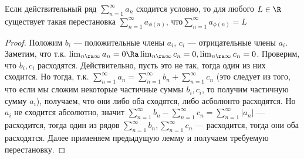 
\begin{theorem}[Римана]
    Если действительный ряд \(\sum_{n = 1}^\infty a_n\) сходится условно, то для любого \(L \in \R\) существует такая перестановка \(\sum_{n = 1}^\infty a_{\phi(n)}\), что\(\sum_{n = 1}^\infty a_{\phi(n)} = L\)
\end{theorem}
\begin{proof}
    Положим \(b_i\) --- положительные члены \(a_i\), \(c_i\) --- отрицательные члены \(a_i\). Заметим, что т.к. \(\lim_{n \ra \infty} a_n = 0 \Ra \lim_{n \ra \infty} c_n = 0, \lim_{n \ra \infty} c_n = 0\). Проверим, что \(b_i, c_i\) расходятся. Действительно, пусть это не так, тогда один из них сходится. Но тогда, т.к. \(\sum_{n = 1}^\infty a_n = \sum_{n = 1}^\infty b_n + \sum_{n = 1}^\infty c_n\) (это следует из того, что если мы сложим некоторые частичные суммы \(b_i, c_i\), то получим частичную сумму \(a_i\)), получаем, что они либо оба сходятся, либо асболюнто расходятся. Но \(a_i\) не сходится абсолютно, значит \(\sum_{n = 1}^\infty b_n - \sum_{n = 1}^\infty c_n = \sum_{n = 1}^\infty |a_n|\) --- расходится, тогда один из рядов \(\sum_{n = 1}^\infty b_n, \sum_{n = 1}^\infty c_n\) --- расходится, тогда они оба расходятся. Далее применяем предыдущую лемму и получаем требуемую перестановку.
\end{proof}

